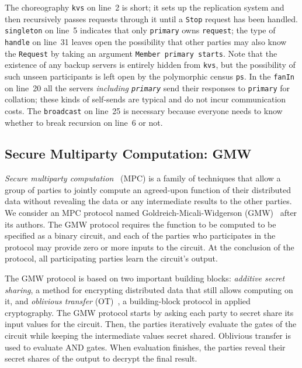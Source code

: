 \documentclass[sigplan,screen,review,anonymous]{acmart}
\newcommand{\inlinecode}[2][haskell]{\texttt{#2}}
\begin{document}
The choreography \inlinecode{kvs} on line~2 is short;
it sets up the replication system and then recursively passes requests through it
until a \inlinecode{Stop} request has been handled.
\inlinecode{singleton} on line~5 indicates that
only \inlinecode{primary} owns \inlinecode{request};
the type of \inlinecode{handle} on line~31 leaves open the possibility
that other parties may also know the \inlinecode{Request} by taking an argument
\inlinecode{Member primary starts}.
Note that the existence of any backup servers is entirely hidden from \inlinecode{kvs},
but the possibility of such unseen participants is left open
by the polymorphic census \inlinecode{ps}.
In the \inlinecode{fanIn} on line~20
all the servers \emph{including \inlinecode{primary}} send their responses
to \inlinecode{primary} for collation;
these kinds of self-sends are typical and do not incur communication costs.
The \inlinecode{broadcast} on line~25 is necessary because everyone needs to know
whether to break recursion on line~6 or not.


\subsection{Secure Multiparty Computation: GMW}\label{sec:gmw}

\emph{Secure multiparty computation}~\cite{evans2018pragmatic} (MPC) is a family of techniques that allow a group of parties to jointly compute an agreed-upon function of their distributed data without revealing the data or any intermediate results to the other parties. We consider an MPC protocol named Goldreich-Micali-Widgerson (GMW)~\cite{goldreich2019play} after its authors. The GMW protocol requires the function to be computed to be specified as a binary circuit, and each of the parties who participates in the protocol may provide zero or more inputs to the circuit. At the conclusion of the protocol, all participating parties learn the circuit's output.

The GMW protocol is based on two important building blocks: \emph{additive secret sharing}, a method for encrypting distributed data that still allows computing on it, and \emph{oblivious transfer} (OT)~\cite{naor2001efficient}, a building-block protocol in applied cryptography. The GMW protocol starts by asking each party to secret share its input values for the circuit. Then, the parties iteratively evaluate the gates of the circuit while keeping the intermediate values secret shared. Oblivious transfer is used to evaluate AND gates. When evaluation finishes, the parties reveal their secret shares of the output to decrypt the final result.
\end{document}
